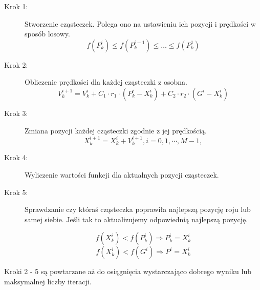 \begin{description}
  \item[Krok 1:] 
     \par Stworzenie cząsteczek. Polega ono na ustawieniu ich pozycji i prędkości w sposób losowy. 
  \[f(P^{i}_{k}) \le f(P^{i-1}_{k}) \le \ldots \le f(P^{1}_{k})\]
  \item[Krok 2:]
    \par Obliczenie prędkości dla każdej cząsteczki z osobna. 
\[V^{i+1}_{k} = V^{i}_{k} + C_{1} \cdot r_{1} \cdot (P^{i}_{k} - X^{i}_{k}) + C_{2} \cdot r_{2} \cdot (G^{i} - X^{i}_{k})\]
  \item[Krok 3:]
        \par Zmiana pozycji każdej cząsteczki zgodnie z jej prędkością.
\[X^{i+1}_{k} = X^{i}_{k} + V^{i+1}_{k}, i = 0,1,\cdots, M-1,\]
  \item[Krok 4:]
        \par Wyliczenie wartości funkcji dla aktualnych pozycji cząsteczek.
  \item[Krok 5:] 
      \par Sprawdzanie czy któraś cząsteczka poprawiła najlepszą pozycję roju lub samej siebie. Jeśli tak to aktualizujemy odpowiednią najlepszą pozycję.

    \[  f(X^{i}_{k}) < f(P^{i}_{k}) \Longrightarrow P^{i}_{k} = X^{i}_{k}\]
\[  f(X^{i}_{k}) < f(G^{i}) \Longrightarrow  P^{i} = X^{i}_{k}\]


\end{description}
    \par Kroki 2 - 5 są powtarzane aż do osiągnięcia wystarczająco dobrego wyniku lub maksymalnej liczby iteracji.
